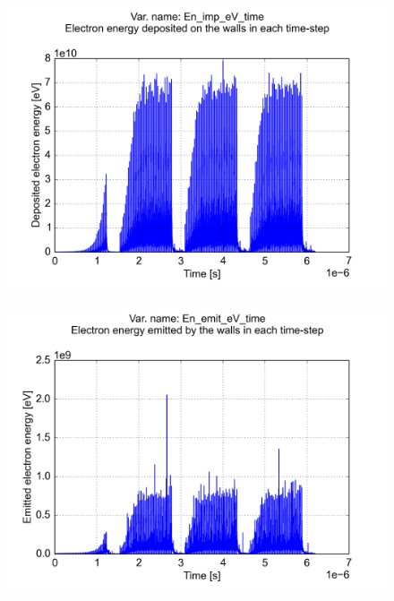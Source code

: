 \documentclass[a4paper,12pt]{article}
\begin{document}
\begin{figure}[p]
\begin{center}
\includegraphics[trim = 0 0 0 0, clip, width=.95\textwidth]{../../example/fig05.png}
\end{center}
\end{figure}

\begin{figure}[p]
\begin{center}
\includegraphics[trim = 0 0 0 0, clip, width=.95\textwidth]{../../example/fig06.png}
\end{center}
\end{figure}

\FloatBarrier
\end{document}

